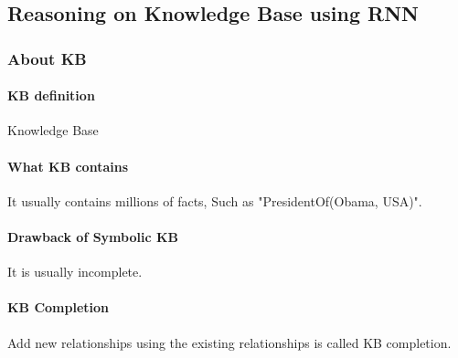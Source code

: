 \documentclass{article}
\begin{document}
\subsection{Reasoning on Knowledge Base using RNN}
\subsubsection{About KB}
\paragraph{KB definition} Knowledge Base
\paragraph{What KB contains} It usually contains millions of facts, Such as "PresidentOf(Obama, USA)".
\paragraph{Drawback of Symbolic KB} It is usually incomplete.
\paragraph{KB Completion} Add new relationships using the existing relationships is called KB completion.
\end{document}
